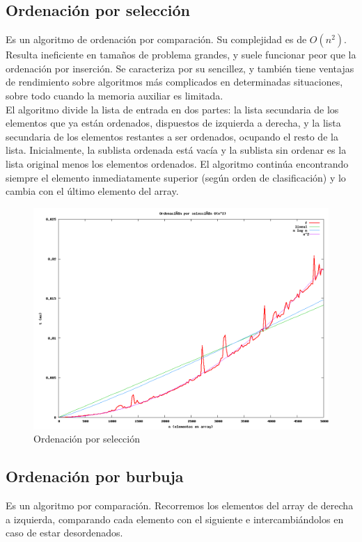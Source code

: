 \subsection{Ordenación por selecci\'on}
Es un algoritmo de ordenación por comparación. Su complejidad es de $O(n^2)$. Resulta ineficiente en tamaños de problema grandes, y suele funcionar peor que la ordenación por inserción. Se caracteriza por su sencillez, y también tiene ventajas de rendimiento sobre algoritmos más complicados en determinadas situaciones, sobre todo cuando la memoria auxiliar es limitada.\\
El algoritmo divide la lista de entrada en dos partes: la lista secundaria de los elementos que ya están ordenados, dispuestos de izquierda a derecha, y la lista secundaria de los elementos restantes a ser ordenados, ocupando el resto de la lista. Inicialmente, la sublista ordenada está vacía y la sublista sin ordenar es la lista original menos los elementos ordenados. El algoritmo continúa encontrando siempre el elemento inmediatamente superior (según orden de clasificación) y lo cambia con el último elemento del array.

	\begin{figure}[H]
	  \centering
	    \includegraphics[width=1.0\textwidth]{selection-sort.png}
	  \caption{Ordenación por selección}
	  \label{fig:selection}
	\end{figure}

\newpage
\subsection{Ordenación por burbuja}
Es un algoritmo por comparación.  Recorremos los elementos del array de derecha a izquierda, comparando cada elemento con el siguiente e intercambiándolos en caso de estar desordenados.

